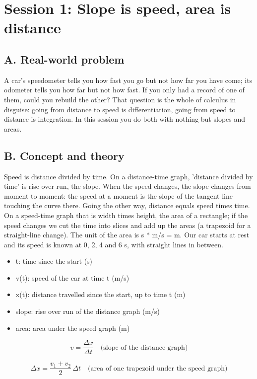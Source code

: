 \documentclass[11pt,a4paper]{article}
\begin{document}
\section{Session 1: Slope is speed, area is distance}

\subsection*{A. Real-world problem}
A car's speedometer tells you how fast you go but not how far you have come; its odometer tells you how far but not how fast. If you only had a record of one of them, could you rebuild the other? That question is the whole of calculus in disguise: going from distance to speed is differentiation, going from speed to distance is integration. In this session you do both with nothing but slopes and areas.

\subsection*{B. Concept and theory}
Speed is distance divided by time. On a distance-time graph, 'distance divided by time' is rise over run, the slope. When the speed changes, the slope changes from moment to moment: the speed at a moment is the slope of the tangent line touching the curve there. Going the other way, distance equals speed times time. On a speed-time graph that is width times height, the area of a rectangle; if the speed changes we cut the time into slices and add up the areas (a trapezoid for a straight-line change). The unit of the area is s * m/s = m. Our car starts at rest and its speed is known at 0, 2, 4 and 6 s, with straight lines in between.

\begin{itemize}[nosep]
\item t: time since the start (s)
\item v(t): speed of the car at time t (m/s)
\item x(t): distance travelled since the start, up to time t (m)
\item slope: rise over run of the distance graph (m/s)
\item area: area under the speed graph (m)
\end{itemize}

\begin{equation*}
v=\frac{\Delta x}{\Delta t}\quad\text{(slope of the distance graph)}
\end{equation*}

\begin{equation*}
\Delta x=\frac{v_1+v_2}{2}\,\Delta t\quad\text{(area of one trapezoid under the speed graph)}
\end{equation*}
\end{document}
